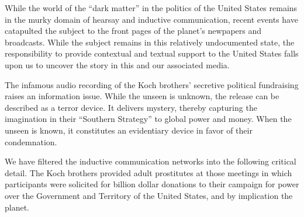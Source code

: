 

While the world of the ``dark matter'' in the politics of the United
States remains in the murky domain of hearsay and inductive
communication, recent events have catapulted the subject to the front
pages of the planet's newpapers and broadcasts.  While the subject
remains in this relatively undocumented state, the responsibility to
provide contextual and textual support to the United States falls upon
us to uncover the story in this and our associated media.

The infamous audio recording of the Koch brothers' secretive political
fundraising raises an information issue.  While the unseen is unknown,
the release can be described as a terror device.  It delivers mystery,
thereby capturing the imagination in their ``Southern Strategy'' to
global power and money.  When the unseen is known, it constitutes an
evidentiary device in favor of their condemnation.

We have filtered the inductive communication networks into the
following critical detail.  The Koch brothers provided adult
prostitutes at those meetings in which participants were solicited for
billion dollar donations to their campaign for power over the
Government and Territory of the United States, and by implication the
planet.

\bye
